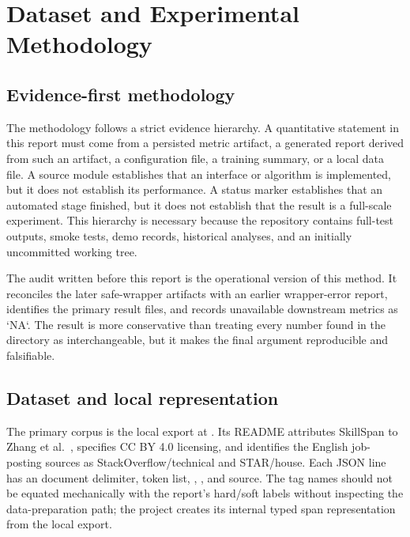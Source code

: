 \chapter{Dataset and Experimental Methodology}
\label{ch:methodology}

\section{Evidence-first methodology}

The methodology follows a strict evidence hierarchy. A quantitative statement in this report must come from a persisted metric artifact, a generated report derived from such an artifact, a configuration file, a training summary, or a local data file. A source module establishes that an interface or algorithm is implemented, but it does not establish its performance. A status marker establishes that an automated stage finished, but it does not establish that the result is a full-scale experiment. This hierarchy is necessary because the repository contains full-test outputs, smoke tests, demo records, historical analyses, and an initially uncommitted working tree.

The audit written before this report is the operational version of this method. It reconciles the later safe-wrapper artifacts with an earlier wrapper-error report, identifies the primary result files, and records unavailable downstream metrics as `NA`. The result is more conservative than treating every number found in the directory as interchangeable, but it makes the final argument reproducible and falsifiable.

\section{Dataset and local representation}

The primary corpus is the local export at . Its README attributes SkillSpan to Zhang et al.~\cite{zhang2022skillspan}, specifies CC BY 4.0 licensing, and identifies the English job-posting sources as StackOverflow/technical and STAR/house. Each JSON line has an  document delimiter, token list, , , and source. The tag names should not be equated mechanically with the report's hard/soft labels without inspecting the data-preparation path; the project creates its internal typed span representation from the local export.



